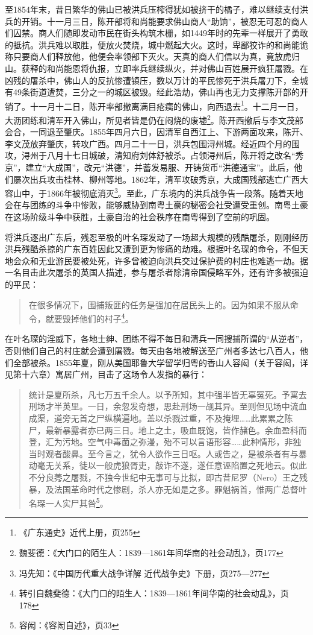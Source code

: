 至1854年末，昔日繁华的佛山已被洪兵压榨得犹如被挤干的橘子，难以继续支付洪兵的开销。十一月三日，陈开部将和尚能要求佛山商人“助饷”，被忍无可忍的商人们囚禁。商人们随即发动市民在街头构筑木栅，如1449年时的先辈一样展开了勇敢的抵抗。洪兵难以取胜，便放火焚烧，城中燃起大火。这时，卑鄙狡诈的和尚能诡称只要商人们释放他，他便会率领部下灭火。天真的商人们信以为真，竟放虎归山。获释的和尚能恩将仇报，立即率兵继续纵火，并对佛山百姓展开疯狂屠戮。在凶残的屠杀中，佛山人的反抗惨遭镇压，数以万计的平民惨死于洪兵屠刀下，全城有49条街道遭焚，三分之一的城区被毁。经此浩劫，佛山再也无力支撑陈开部的开销了。十一月十二日，陈开率部撤离满目疮痍的佛山，向西退去\footnote{《广东通史》近代上册，页255}。十二月一日，大沥团练和清军开入佛山，所见者皆是仍在闷烧的废墟\footnote{魏斐德：《大门口的陌生人：1839—1861年间华南的社会动乱》，页177}。陈开西撤后与李文茂部会合，一同退至肇庆。1855年四月六日，因清军自西江上、下游两面攻来，陈开、李文茂放弃肇庆，转攻广西。四月二十一日，洪兵包围浔州城。经近四个月的围攻，浔州于八月十七日城破，清知府刘体舒被杀。占领浔州后，陈开将之改名“秀京”，建立“大成国”，改元“洪德”，并蓄发易服、开铸货币“洪德通宝”。此后，他们屡次出兵攻击桂林、柳州等地。1862年，清军攻破秀京，大成国残部逃亡广西大容山中，于1866年被彻底消灭\footnote{冯先知：《中国历代重大战争详解 近代战争史》下册，页275—277}。至此，广东境内的洪兵战争告一段落。随着天地会在与团练的斗争中惨败，能够威胁到南粤土豪的秘密会社受遭受重创。南粤土豪在这场阶级斗争中获胜，土豪自治的社会秩序在南粤得到了空前的巩固。

将洪兵逐出广东后，残忍至极的叶名琛发动了一场超大规模的残酷屠杀，刚刚经历洪兵残酷杀掠的广东百姓因此又遭到更为惨痛的劫难。根据叶名琛的命令，不但天地会众和无业游民要被处死，许多曾被迫向洪兵交过保护费的村庄也难逃一劫。据一名目击此次屠杀的英国人描述，参与屠杀者除清帝国侵略军外，还有许多被强迫的平民：

\begin{quote}

在很多情况下，围捕叛匪的任务是强加在居民头上的。因为如果不服从命令，就要毁掉他们的村子\footnote{转引自魏斐德：《大门口的陌生人：1839—1861年间华南的社会动乱》，页178}。

\end{quote}
	
在叶名琛的淫威下，各地士绅、团练不得不每日和清兵一同搜捕所谓的“从逆者”，否则他们自己的村庄就会遭到屠戮。每天由各地被解送至广州者多达七八百人，他们全部被杀。1855年夏，刚从美国耶鲁大学留学归粤的香山人容闳（关于容闳，详见第十六章）寓居广州，目击了这场令人发指的暴行：

\begin{quote}
统计是夏所杀，凡七万五千余人。以予所知，其中强半皆无辜冤死。予寓去刑场才半英里。一日，余忽发奇想，思赴刑场一觇其异。至则但见场中流血成渠，道旁无首之尸纵横遍地。盖以杀戮过重，不及掩埋……此累累之陈尸，最新暴露者亦已两三日。地上之土，吸血既饱，皆作赭色。余血盈科而登，汇为污地。空气中毒菌之弥漫，殆不可以言语形容……此种情形，非独当时观者酸鼻。至今言之，犹令人欲作三日呕。人或告之，是被杀者有与暴动毫无关系，徒以一般虎狼胥吏，敲诈不遂，遂任意诬陷置之死地云。似此不分良莠之屠戮，不独今世纪中无事可与比拟，即古昔尼罗（Nero）王之残暴，及法国革命时代之惨剧，杀人亦无如是之多。罪魁祸首，惟两广总督叶名琛一人实尸其咎\footnote{容闳：《容闳自述》，页33}。

\end{quote}

